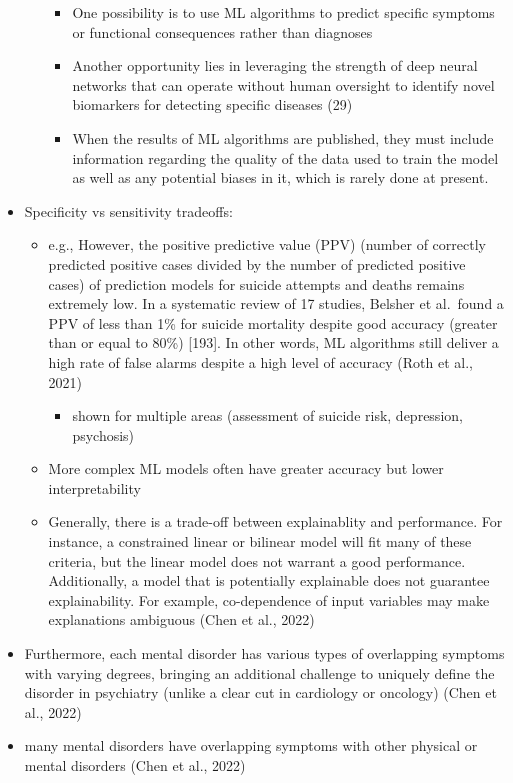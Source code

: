 \documentclass[
  man]{apa7}
\providecommand{\tightlist}{%
  \setlength{\itemsep}{0pt}\setlength{\parskip}{0pt}}
\begin{document}
\begin{itemize}
\begin{itemize}
    \begin{itemize}
    \tightlist
    \item
      One possibility is to use ML algorithms to predict specific symptoms or functional consequences rather than diagnoses
    \item
      Another opportunity lies in leveraging the strength of deep neural networks that can operate without human oversight to identify novel biomarkers for detecting specific diseases (29)
    \item
      When the results of ML algorithms are published, they must include information regarding the quality of the data used to train the model as well as any potential biases in it, which is rarely done at present.
    \end{itemize}
  \end{itemize}
\item
  Specificity vs sensitivity tradeoffs:

  \begin{itemize}
  \tightlist
  \item
    e.g., However, the positive predictive value (PPV) (number of correctly predicted positive cases divided by the number of predicted positive cases) of prediction models for suicide attempts and deaths remains extremely low. In a systematic review of 17 studies, Belsher et al.~found a PPV of less than 1\% for suicide mortality despite good accuracy (greater than or equal to 80\%) {[}193{]}. In other words, ML algorithms still deliver a high rate of false alarms despite a high level of accuracy (Roth et al., 2021)

    \begin{itemize}
    \tightlist
    \item
      shown for multiple areas (assessment of suicide risk, depression, psychosis)
    \end{itemize}
  \item
    More complex ML models often have greater accuracy but lower interpretability
  \item
    Generally, there is a trade-off between explainablity and performance. For instance, a constrained linear or bilinear model will fit many of these criteria, but the linear model does not warrant a good performance. Additionally, a model that is potentially explainable does not guarantee explainability. For example, co-dependence of input variables may make explanations ambiguous (Chen et al., 2022)
  \end{itemize}
\item
  Furthermore, each mental disorder has various types of overlapping symptoms with varying degrees, bringing an additional challenge to uniquely define the disorder in psychiatry (unlike a clear cut in cardiology or oncology) (Chen et al., 2022)
\item
  many mental disorders have overlapping symptoms with other physical or mental disorders (Chen et al., 2022)
\end{itemize}
\end{document}
